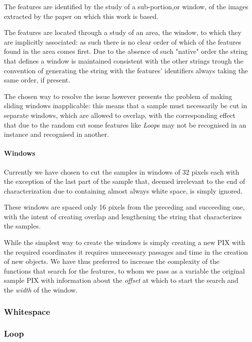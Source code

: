 \documentclass[a4paper,12pt]{article}
\begin{document}
The features are identified by the study of a sub-portion,or window, of the images extracted by the paper on which this work is based.

The features are located through a study of an area, the window, to which they are implicitly associated: as such there is no clear order of which of the features found in the area comes first.
Due to the absence of such "native" order the string that defines a window is maintained consistent with the other strings trough the convention of generating the string with the features' identifiers always taking the same order, if present.

The chosen way to resolve the issue however presents the problem of making sliding windows inapplicable: this means that a sample must necessarily be cut in separate windows, which are allowed to overlap, with the corresponding effect that due to the random cut some features like \textit{Loop}s may not be recognised in an instance and recognised in another. 

\paragraph{Windows}
Currently we have chosen to cut the samples in windows of 32 pixels each with the exception of the last part of the sample that, deemed irrelevant to the end of characterization due to containing almost always white space, is simply ignored.

These windows are spaced only 16 pixels from the preceding and succeeding one, with the intent of creating overlap and lengthening the string that characterizes the samples.

While the simplest way to create the windows is simply creating a new PIX with the required coordinates it requires unnecessary passages and time in the creation of new objects. We have thus preferred to increase the complexity of the functions that search for the features, to whom we pass as a variable the original sample PIX with information about the \textit{offset} at which to start the search and the \textit{width} of the window.


\subsubsection{Whitespace}  

\subsubsection{Loop}
\end{document}

